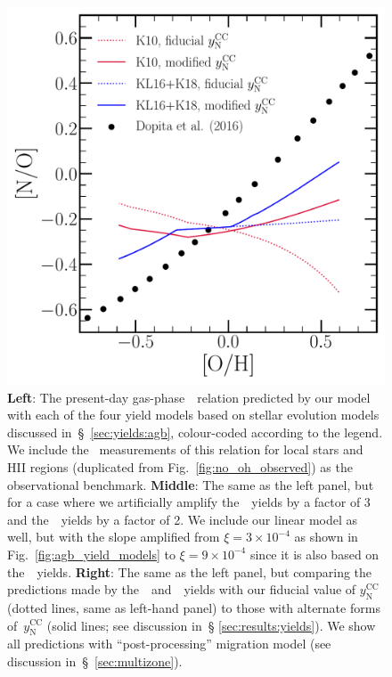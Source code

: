 \documentclass[ms.tex]{subfiles}
\begin{document}
\begin{figure}
\includegraphics[scale = 0.32]{no_oh_predictions_karakas.pdf}
\caption{
\textbf{Left}: The present-day gas-phase~\ohno~relation predicted by our
model with each of the four yield models based on stellar evolution models
discussed in~\S~\ref{sec:yields:agb}, colour-coded according to the legend.
We include the~\citet{Dopita2016} measurements of this relation for local stars
and HII regions (duplicated from Fig.~\ref{fig:no_oh_observed}) as the
observational benchmark.
\textbf{Middle}: The same as the left panel, but for a case where we
artificially amplify the~\cristallo~yields by a factor of 3 and
the~\ventura~yields by a factor of 2.
We include our linear model as well, but with the slope amplified from
$\xi = 3\times10^{-4}$ as shown in Fig.~\ref{fig:agb_yield_models} to
$\xi = 9\times10^{-4}$ since it is also based on the~\cristallo~yields.
\textbf{Right}: The same as the left panel, but comparing the predictions made
by the~\karakasten~and~\karakas~yields with our fiducial value of
$y_\text{N}^\text{CC}$ (dotted lines, same as left-hand panel) to those with
alternate forms of~$y_\text{N}^\text{CC}$ (solid lines; see discussion in~\S
\ref{sec:results:yields}).
We show all predictions with ``post-processing'' migration model (see
discussion in~\S~\ref{sec:multizone}).
}
\label{fig:no_oh_predictions}
\end{figure}
\end{document}
